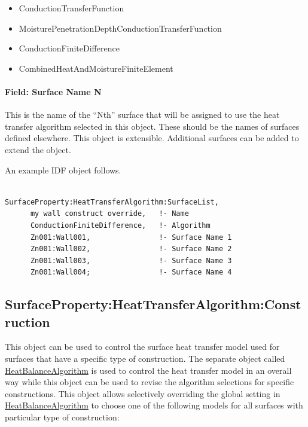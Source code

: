 \begin{itemize}
\item
  ConductionTransferFunction
\item
  MoisturePenetrationDepthConductionTransferFunction
\item
  ConductionFiniteDifference
\item
  CombinedHeatAndMoistureFiniteElement
\end{itemize}

\paragraph{Field: Surface Name N}\label{field-surface-name-n}

This is the name of the ``Nth'' surface that will be assigned to use the heat transfer algorithm selected in this object. These should be the names of surfaces defined elsewhere. This object is extensible. Additional surfaces can be added to extend the object.

An example IDF object follows.

\begin{lstlisting}

SurfaceProperty:HeatTransferAlgorithm:SurfaceList,
      my wall construct override,   !- Name
      ConductionFiniteDifference,   !- Algorithm
      Zn001:Wall001,                !- Surface Name 1
      Zn001:Wall002,                !- Surface Name 2
      Zn001:Wall003,                !- Surface Name 3
      Zn001:Wall004;                !- Surface Name 4
\end{lstlisting}

\subsection{SurfaceProperty:HeatTransferAlgorithm:Construction}\label{surfacepropertyheattransferalgorithmconstruction}

This object can be used to control the surface heat transfer model used for surfaces that have a specific type of construction. The separate object called \hyperref[heatbalancealgorithm]{HeatBalanceAlgorithm} is used to control the heat transfer model in an overall way while this object can be used to revise the algorithm selections for specific constructions. This object allows selectively overriding the global setting in \hyperref[heatbalancealgorithm]{HeatBalanceAlgorithm} to choose one of the following models for all surfaces with particular type of construction:

